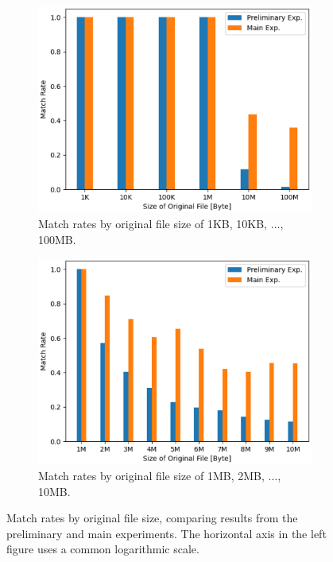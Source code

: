 \begin{figure}[h]
  \centering
  \begin{subfigure}[b]{0.48\columnwidth}
    \centering
    \includegraphics[width=\columnwidth]{doc/img/eval/seqential_vs_parallel_match_p4_exp.eps}
    \caption{Match rates by original file size of 1KB, 10KB, $\ldots$, 100MB.}
    \label{fig:seq-vs-par-exp}
  \end{subfigure}
  \hspace{0.02\columnwidth}
  \begin{subfigure}[b]{0.48\columnwidth}
    \centering
    \includegraphics[width=\columnwidth]{doc/img/eval/seqential_vs_parallel_match_p4_inc.eps}
    \caption{Match rates by original file size of 1MB, 2MB, $\ldots$, 10MB.}
    \label{fig:seq-vs-par-inc}
  \end{subfigure}
  \caption{Match rates by original file size, comparing results from the preliminary and main experiments.
    The horizontal axis in the left figure uses a common logarithmic scale.}
\end{figure}

